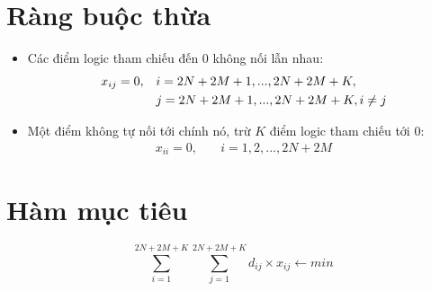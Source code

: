 \documentclass[3p,12pt]{article}
\begin{document}
	\section{Ràng buộc thừa}
	\begin{itemize}
		\item Các điểm logic tham chiếu đến $0$ không nối lẫn nhau:
		\begin{align}
			x_{ij}=0,\quad & i=2N+2M+1,...,2N+2M+K, \\
							& j=2N+2M+1,...,2N+2M+K, i\ne j \notag
		\end{align}
		\item Một điểm không tự nối tới chính nó, trừ $K$ điểm logic tham chiếu tới $0$:
		\begin{align}
			x_{ii}=0,\quad & i=1,2,...,2N+2M
		\end{align}
	\end{itemize}

	\section{Hàm mục tiêu}
	\begin{equation}
		\sum_{i=1}^{2N+2M+K} \sum_{j=1}^{2N+2M+K} d_{ij}\times x_{ij} \leftarrow min
	\end{equation}
\end{document}
